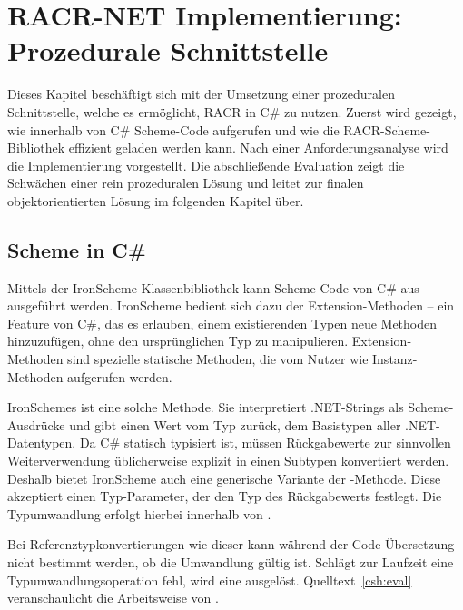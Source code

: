 

\chapter{RACR-NET Implementierung: Prozedurale Schnittstelle}\label{umsetzung1}

Dieses Kapitel beschäftigt sich mit der Umsetzung einer prozeduralen Schnittstelle, welche es ermöglicht, RACR in C\# zu nutzen. Zuerst wird gezeigt, wie innerhalb von C\# Scheme-Code aufgerufen und wie die RACR-Scheme-Bibliothek effizient geladen werden kann. Nach einer Anforderungsanalyse wird die Implementierung vorgestellt. Die abschließende Evaluation zeigt die Schwächen einer rein prozeduralen Lösung und leitet zur finalen objektorientierten Lösung im folgenden Kapitel über.

\section{Scheme in C\#}

Mittels der IronScheme-Klassenbibliothek kann Scheme-Code von C\# aus ausgeführt werden. IronScheme bedient sich dazu der Extension-Methoden – ein Feature von C\#, das es erlauben, einem existierenden Typen neue Methoden hinzuzufügen, ohne den ursprünglichen Typ zu manipulieren. Extension-Methoden sind spezielle statische Methoden, die vom Nutzer wie Instanz-Methoden aufgerufen werden.

IronSchemes  ist eine solche Methode. Sie interpretiert .NET-Strings als Scheme-Ausdrücke und gibt einen Wert vom Typ  zurück, dem Basistypen aller .NET-Datentypen. Da C\# statisch typisiert ist, müssen Rückgabewerte zur sinnvollen Weiterverwendung üblicherweise explizit in einen Subtypen konvertiert werden. Deshalb bietet IronScheme auch eine generische Variante der -Methode. Diese akzeptiert einen Typ-Parameter, der den Typ des Rückgabewerts festlegt. Die Typumwandlung erfolgt hierbei innerhalb von .

Bei Referenztypkonvertierungen wie dieser kann während der Code-Übersetzung nicht bestimmt werden, ob die Umwandlung gültig ist. Schlägt zur Laufzeit eine Typumwandlungsoperation fehl, wird eine  ausgelöst. Quelltext~\ref{csh:eval} veranschaulicht die Arbeitsweise von .

